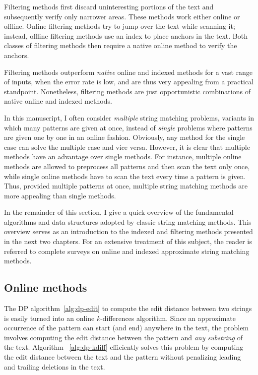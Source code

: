 Filtering methods first discard uninteresting portions of the text and subsequently verify only narrower areas.
These methods work either online or offline.
Online filtering methods try to jump over the text while scanning it; instead, offline filtering methods use an index to place anchors in the text.
Both classes of filtering methods then require a native online method to verify the anchors.

Filtering methods outperform \emph{native} online and indexed methods for a vast range of inputs, \ie when the error rate is low, and are thus very appealing from a practical standpoint.
Nonetheless, filtering methods are just opportunistic combinations of native online and indexed methods.

In this manuscript, I often consider \emph{multiple} string matching problems, \ie variants in which many patterns are given at once, instead of \emph{single} problems where patterns are given one by one in an online fashion.
Obviously, any method for the single case can solve the multiple case and vice versa.
However, it is clear that multiple methods have an advantage over single methods.
For instance, multiple online methods are allowed to preprocess all patterns and then scan the text only once, while single online methods have to scan the text every time a pattern is given.
Thus, provided multiple patterns at once, multiple string matching methods are more appealing than single methods.

In the remainder of this section, I give a quick overview of the fundamental algorithms and data structures adopted by classic string matching methods.
This overview serves as an introduction to the indexed and filtering methods presented in the next two chapters.
For an extensive treatment of this subject, the reader is referred to complete surveys on online \citep{Navarro2001a} and indexed \citep{Navarro2001} approximate string matching methods.


\subsection{Online methods}
\label{sub:introonline}


The DP algorithm~\ref{alg:dp-edit} to compute the edit distance between two strings is easily turned into an online $k$-differences algorithm.
Since an approximate occurrence of the pattern can start (and end) anywhere in the text, the problem involves computing the edit distance between the pattern and \emph{any substring} of the text.
Algorithm ~\ref{alg:dp-kdiff} efficiently solves this problem by computing the edit distance between the text and the pattern without penalizing leading and trailing deletions in the text.

